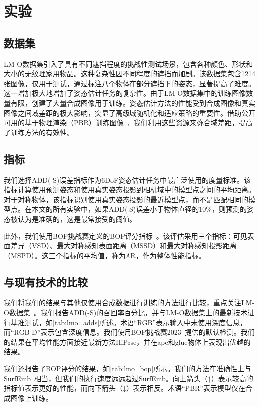 \section{实验}

\subsection{数据集}
LM-O数据集\cite{lmo}引入了具有不同遮挡程度的挑战性测试场景，包含各种颜色、形状和大小的无纹理家用物品。这种复杂性因不同程度的遮挡而加剧。该数据集包含1214张图像，仅用于测试，通过标注八个物体在部分遮挡下的姿态，显著提高了难度。这一增加极大地增加了姿态估计任务的复杂性。由于LM-O数据集中的训练图像数量有限，创建了大量合成图像用于训练。姿态估计方法的性能受到合成图像和真实图像之间域差距的极大影响，突显了高级域随机化和适应策略的重要性。借助公开可用的基于物理渲染（PBR）训练图像~\cite{hodan2024bop}，我们利用这些资源来弥合域差距，提高了训练方法的有效性。

\subsection{指标}
我们选择ADD(-S)误差指标作为6DoF姿态估计任务中最广泛使用的度量标准。该指标计算使用预测姿态和使用真实姿态投影到相机域中的模型点之间的平均距离。对于对称物体，该指标识别使用真实姿态投影的最近模型点，而不是匹配相同的模型点。在本文的所有实验中，如果ADD(-S)误差小于物体直径的$10\%$，则预测的姿态被认为是准确的，这是最常接受的阈值。

此外，我们使用BOP挑战赛定义的BOP评分指标~\cite{hodan2024bop}。该评估采用三个指标：可见表面差异（VSD）、最大对称感知表面距离（MSSD）和最大对称感知投影距离（MSPD）。这三个指标的平均值，称为AR，作为整体性能指标。

\subsection{与现有技术的比较}

我们将我们的结果与其他仅使用合成数据进行训练的方法进行比较，重点关注LM-O数据集~\cite{brachmann2016lmo}。我们报告ADD(-S)的召回率百分比，并与LM-O数据集上的最新技术进行基准测试，如\autoref{tab:lmo_adds}所述。术语“RGB”表示输入中未使用深度信息，而“RGB-D”表示包含深度信息。我们使用BOP挑战赛2023~\cite{hodan2024bop}提供的默认检测。我们的结果在平均性能方面接近最新方法HiPose，并在ape和glue物体上表现出优越的结果。

我们还报告了BOP评分的结果，如\autoref{tab:lmo_bop}所示。我们的方法在准确性上与SurfEmb~\cite{haugaard2022surfemb}相当，但我们的执行速度远远超过SurfEmb。向上箭头（↑）表示较高的指标值表示更好的性能，而向下箭头（↓）表示相反。术语“PBR”表示模型仅在合成图像上训练。

